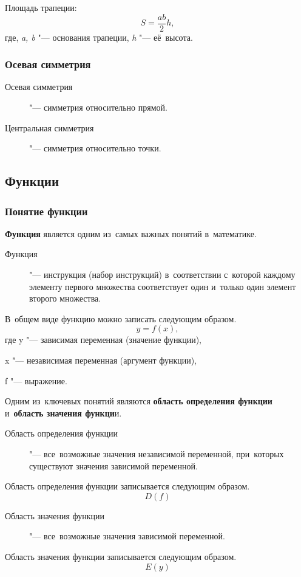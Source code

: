 \documentclass[]{scrartcl}
\begin{document}
Площадь трапеции:
\begin{equation}\label{eq:parallelogram-square}
S=\frac{ab}{2}h,
\end{equation}
где, \textit{a, b} "--- основания трапеции, \textit{h} "--- её~высота.


\subsubsection{Осевая симметрия}
\begin{description}
	\item[Осевая симметрия] "--- симметрия относительно прямой.
\end{description}

\begin{description}
	\item[Центральная симметрия] "--- симметрия относительно точки.
\end{description} 

\subsection{Функции}
\subsubsection{Понятие функции}
\textbf{Функция} является одним из~самых важных понятий в~математике.
\begin{description}
	\item[Функция] "--- инструкция (набор инструкций) в~соответствии с~которой каждому элементу первого множества соответствует один и~только один элемент второго множества.
\end{description}
В~общем виде функцию можно записать следующим образом.
\begin{equation}\label{function}
y=f(x),
\end{equation}
где y "--- зависимая переменная (значение функции),

x "--- независимая переменная (аргумент функции),

f "--- выражение.

Одним из~ключевых понятий являются \textbf{область определения функции} и~\textbf{область значения функци}и.
\begin{description}
	\item[Область определения функции] "--- все~возможные значения независимой переменной, при~которых существуют значения зависимой переменной.
\end{description}
Область определения функции записывается следующим образом.
\begin{equation}\label{eq:function-domain}
D(f)
\end{equation}
\begin{description}
	\item[Область значения функции] "--- все~возможные значения зависимой переменной.
\end{description}
Область значения функции записывается следующим образом.
\begin{equation}\label{eq:function-exists}
E(y)
\end{equation}
\end{document}
